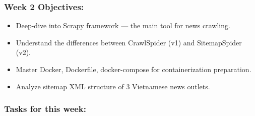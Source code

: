 \hypertarget{week-2-objectives}{%
\subsubsection{Week 2 Objectives:}}

\begin{itemize}
\tightlist
\item
  Deep-dive into Scrapy framework --- the main tool for news crawling.
\item
  Understand the differences between CrawlSpider (v1) and SitemapSpider
  (v2).
\item
  Master Docker, Dockerfile, docker-compose for containerization
  preparation.
\item
  Analyze sitemap XML structure of 3 Vietnamese news outlets.
\end{itemize}

\hypertarget{tasks-for-this-week}{%
\subsubsection{Tasks for this week:}}

